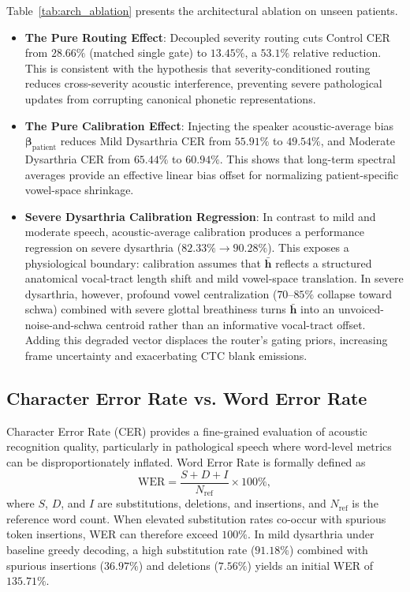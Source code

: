 \documentclass[10pt,twocolumn]{article}
\begin{document}
Table~\ref{tab:arch_ablation} presents the architectural ablation on unseen patients.
\begin{itemize}
    \item \textbf{The Pure Routing Effect}: Decoupled severity routing cuts Control CER from $28.66\%$ (matched single gate) to $\mathbf{13.45\%}$, a $53.1\%$ relative reduction. This is consistent with the hypothesis that severity-conditioned routing reduces cross-severity acoustic interference, preventing severe pathological updates from corrupting canonical phonetic representations.
    \item \textbf{The Pure Calibration Effect}: Injecting the speaker acoustic-average bias $\bm{\beta}_{\text{patient}}$ reduces Mild Dysarthria CER from $55.91\%$ to $\mathbf{49.54\%}$, and Moderate Dysarthria CER from $65.44\%$ to $\mathbf{60.94\%}$. This shows that long-term spectral averages provide an effective linear bias offset for normalizing patient-specific vowel-space shrinkage.
    \item \textbf{Severe Dysarthria Calibration Regression}: In contrast to mild and moderate speech, acoustic-average calibration produces a performance regression on severe dysarthria ($82.33\% \to 90.28\%$). This exposes a physiological boundary: calibration assumes that $\bar{\bm{h}}$ reflects a structured anatomical vocal-tract length shift and mild vowel-space translation. In severe dysarthria, however, profound vowel centralization ($70$--$85\%$ collapse toward schwa) combined with severe glottal breathiness turns $\bar{\bm{h}}$ into an unvoiced-noise-and-schwa centroid rather than an informative vocal-tract offset. Adding this degraded vector displaces the router's gating priors, increasing frame uncertainty and exacerbating CTC blank emissions.
\end{itemize}

\subsection{Character Error Rate vs. Word Error Rate}

Character Error Rate (CER) provides a fine-grained evaluation of acoustic recognition quality, particularly in pathological speech where word-level metrics can be disproportionately inflated. Word Error Rate is formally defined as
\begin{equation}
    \text{WER} = \frac{S + D + I}{N_{\text{ref}}} \times 100\%,
\end{equation}
where $S$, $D$, and $I$ are substitutions, deletions, and insertions, and $N_{\text{ref}}$ is the reference word count. When elevated substitution rates co-occur with spurious token insertions, WER can therefore exceed $100\%$. In mild dysarthria under baseline greedy decoding, a high substitution rate ($91.18\%$) combined with spurious insertions ($36.97\%$) and deletions ($7.56\%$) yields an initial WER of $135.71\%$.
\end{document}
